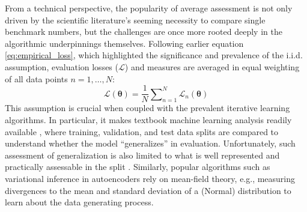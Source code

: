 \documentclass[manuscript,screen,authorversion,nonacm]{acmart}
\begin{document}
From a technical perspective, the popularity of average assessment is not only driven by the scientific literature's seeming necessity to compare single benchmark numbers, but the challenges are once more rooted deeply in the algorithmic underpinnings themselves. Following earlier equation \ref{eq:empirical_loss}, which highlighted the significance and prevalence of the i.i.d. assumption, evaluation losses ($\mathcal{L}$) and measures are  averaged in equal weighting of all data points $n = 1, \ldots, N$: 
\begin{equation}
    \mathcal{L}(\mathbf{\theta}) = \frac{1}{N} \sum\nolimits_{n=1}^{N} \mathcal{L}_{n}(\mathbf{\theta})
\end{equation}
This assumption is crucial when coupled with the prevalent iterative learning algorithms. In particular, it makes textbook machine learning analysis readily available \cite{Bishop2006MLBook}, where training, validation, and test data splits are compared to understand whether the model ``generalizes'' in evaluation. Unfortunately, such assessment of generalization is also limited to what is well represented and practically assessable in the split \cite{zhang2017understanding}. Similarly, popular algorithms such as variational inference in autoencoders \cite{kingma2014auto,kingma2019introduction} rely on mean-field theory, e.g., measuring divergences to the mean and standard deviation of a (Normal) distribution to learn about the data generating process. 
\end{document}
